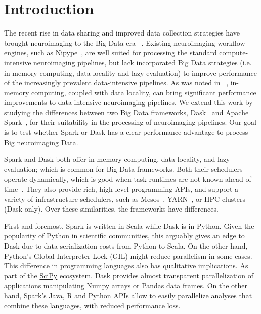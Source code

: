 \documentclass[conference]{IEEEtran}
\begin{document}
\section{Introduction}
The recent rise in data sharing and improved data collection strategies
have brought neuroimaging to the Big Data era ~\cite{ALFAROALMAGRO:18,
UKBioBank:18}. Existing neuroimaging workflow engines, such as
Nipype~\cite{Nipype:11}, are well suited for processing the standard
compute-intensive neuroimaging pipelines, but lack incorporated Big Data
strategies (i.e. in-memory computing, data locality and lazy-evaluation) to
improve performance of the increasingly prevalent data-intensive pipelines.
As was noted in ~\cite{hayot2019performance}, in-memory computing, coupled
with data locality, can bring significant performance improvements to data
intensive neuroimaging pipelines. We extend this work by studying the
differences between two Big Data frameworks, Dask~\cite{Dask:15} and Apache
Spark~\cite{Spark:16}, for their suitability in the processing of neuroimaging
pipelines. Our goal is to test whether Spark or Dask has a clear
performance advantage to process Big neuroimaging Data. 

Spark and Dask both offer in-memory computing, data locality, and lazy evaluation;
which is common for Big Data frameworks. Both their schedulers operate dynamically,
which is good when task runtimes are not known ahead of time~\cite{Dask:15}. They
also provide rich, high-level programming APIs, and support a variety of
infrastructure schedulers, such as Mesos~\cite{hindman2011mesos}, YARN~\cite{vavilapalli2013apache}, or HPC clusters (Dask only). Over
these similarities, the frameworks have differences.

First and foremost, Spark is written in Scala while Dask is in Python.
Given the popularity of Python in scientific communities, this arguably
gives an edge to Dask due to data serialization costs from Python to Scala.
On the other hand, Python's Global Interpreter Lock (GIL) might reduce
parallelism in some cases. This difference in programming languages also
has qualitative implications. As part of the \href{http://scipy.org}{SciPy}
ecosystem, Dask provides almost transparent parallelization of applications
manipulating Numpy arrays or Pandas data frames. On the other hand, Spark's
Java, R and Python APIs allow to easily parallelize analyses that combine
these languages, with reduced performance loss.
\end{document}
